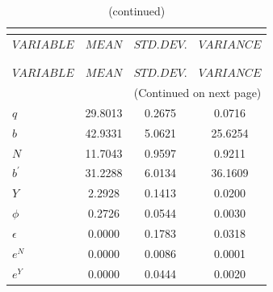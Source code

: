  
\begin{center}
\begin{longtable}{lccc} 
\caption{THEORETICAL MOMENTS}\\
 \label{Table:th_moments}\\
\toprule 
$VARIABLE  $	 & 	 $         MEAN$	 & 	 $    STD. DEV.$	 & 	 $     VARIANCE$\\
\midrule \endfirsthead 
\caption{(continued)}\\
 \toprule \\ 
$VARIABLE  $	 & 	 $         MEAN$	 & 	 $    STD. DEV.$	 & 	 $     VARIANCE$\\
\midrule \endhead 
\midrule \multicolumn{4}{r}{(Continued on next page)} \\ \bottomrule \endfoot 
\bottomrule \endlastfoot 
$q         $	 & 	      29.8013	 & 	       0.2675	 & 	       0.0716 \\ 
$b         $	 & 	      42.9331	 & 	       5.0621	 & 	      25.6254 \\ 
$N         $	 & 	      11.7043	 & 	       0.9597	 & 	       0.9211 \\ 
$b^\prime  $	 & 	      31.2288	 & 	       6.0134	 & 	      36.1609 \\ 
$Y         $	 & 	       2.2928	 & 	       0.1413	 & 	       0.0200 \\ 
$\phi      $	 & 	       0.2726	 & 	       0.0544	 & 	       0.0030 \\ 
$\epsilon  $	 & 	       0.0000	 & 	       0.1783	 & 	       0.0318 \\ 
$e^N       $	 & 	       0.0000	 & 	       0.0086	 & 	       0.0001 \\ 
$e^Y       $	 & 	       0.0000	 & 	       0.0444	 & 	       0.0020 \\ 
\end{longtable}
 \end{center}
